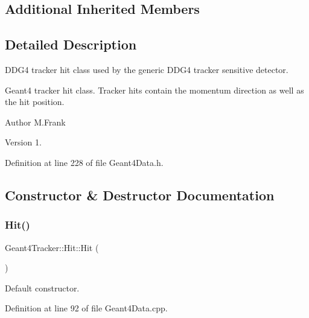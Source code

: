\subsection*{Additional Inherited Members}


\subsection{Detailed Description}
D\+D\+G4 tracker hit class used by the generic D\+D\+G4 tracker sensitive detector. 

Geant4 tracker hit class. Tracker hits contain the momentum direction as well as the hit position.

\begin{DoxyAuthor}{Author}
M.\+Frank 
\end{DoxyAuthor}
\begin{DoxyVersion}{Version}
1. 
\end{DoxyVersion}


Definition at line 228 of file Geant4\+Data.\+h.



\subsection{Constructor \& Destructor Documentation}
\hypertarget{class_d_d4hep_1_1_simulation_1_1_geant4_tracker_1_1_hit_a0a9d1a37e9de22e048ad01d09abeea3a}{}\label{class_d_d4hep_1_1_simulation_1_1_geant4_tracker_1_1_hit_a0a9d1a37e9de22e048ad01d09abeea3a} 
\subsubsection{\texorpdfstring{Hit()}{Hit()}\hspace{0.1cm}{\footnotesize\ttfamily [1/2]}}
{\footnotesize\ttfamily Geant4\+Tracker\+::\+Hit\+::\+Hit (\begin{DoxyParamCaption}{ }\end{DoxyParamCaption})}



Default constructor. 



Definition at line 92 of file Geant4\+Data.\+cpp.



